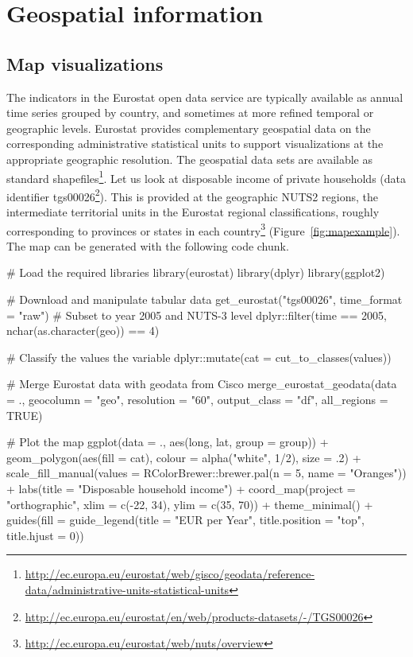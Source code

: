 \section{Geospatial information}

\subsection{Map visualizations}

The indicators in the Eurostat open data service are typically
available as annual time series grouped by country, and sometimes at
more refined temporal or geographic levels. Eurostat provides
complementary geospatial data on the corresponding administrative
statistical units to support visualizations at the appropriate
geographic resolution. The geospatial data sets are available as
standard shapefiles\footnote{\url{http://ec.europa.eu/eurostat/web/gisco/geodata/reference-data/administrative-units-statistical-units}}. Let
us look at disposable income of private households (data identifier
tgs00026\footnote{\url{http://ec.europa.eu/eurostat/en/web/products-datasets/-/TGS00026}}). This is provided at the geographic NUTS2 regions, the intermediate territorial units in the Eurostat regional classifications, roughly
corresponding to provinces or states in each country\footnote{\url{http://ec.europa.eu/eurostat/web/nuts/overview}} (Figure~\ref{fig:mapexample}). The map can be generated with the following code chunk.

\begin{example}
  # Load the required libraries
  library(eurostat)
  library(dplyr)
  library(ggplot2)

  # Download and manipulate tabular data
  get_eurostat("tgs00026", time_format = "raw") %
    # Subset to year 2005 and NUTS-3 level
    dplyr::filter(time == 2005, nchar(as.character(geo)) == 4) %

    # Classify the values the variable
    dplyr::mutate(cat = cut_to_classes(values)) %

    # Merge Eurostat data with geodata from Cisco
    merge_eurostat_geodata(data = ., geocolumn = "geo", resolution = "60",
                         output_class = "df", all_regions = TRUE) %

  # Plot the map
  ggplot(data = ., aes(long, lat, group = group)) +
    geom_polygon(aes(fill = cat), colour = alpha("white", 1/2), size = .2) +
    scale_fill_manual(values = RColorBrewer::brewer.pal(n = 5, name = "Oranges")) +
    labs(title = "Disposable household income") +
    coord_map(project = "orthographic", xlim = c(-22, 34), ylim = c(35, 70)) +
    theme_minimal() +
    guides(fill = guide_legend(title = "EUR per Year",
           title.position = "top", title.hjust = 0))
\end{example}


